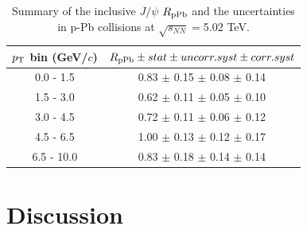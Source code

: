 \begin{table}[!h]
  \centering
  \begin{tabular}{c|c} \hline
    $p_{\rm{T}}$ bin (GeV/$c$)  & $R_{\rm{pPb}}\pm stat \pm uncorr. syst \pm corr. syst$ \\ \hline
    0.0 - 1.5 & 0.83 $\pm$ 0.15 $\pm$ 0.08 $\pm$ 0.14 \\
    1.5 - 3.0    & 0.62 $\pm$ 0.11 $\pm$ 0.05 $\pm$ 0.10 \\
    3.0 - 4.5  & 0.72 $\pm$ 0.11 $\pm$ 0.06 $\pm$ 0.12 \\
    4.5 - 6.5 & 1.00 $\pm$ 0.13 $\pm$ 0.12 $\pm$ 0.17 \\
    6.5 - 10.0 & 0.83 $\pm$ 0.18 $\pm$ 0.14 $\pm$ 0.14 \\ \hline
  \end{tabular}
  \caption{Summary of the inclusive $J/\psi$ $R_{\rm{pPb}}$ and the uncertainties in p-Pb collisions at $\sqrt{s_{NN}}=$5.02 TeV.}
  \label{table_5_rppb}
\end{table}

\clearpage
\section{Discussion}
